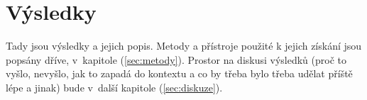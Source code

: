 \chapter{Výsledky}
\label{sec:vysledky}

\noindent Tady jsou výsledky a jejich popis. Metody a přístroje použité k jejich získání jsou popsány dříve, v~kapitole (\ref{sec:metody}). Prostor na diskusi výsledků (proč to vyšlo, nevyšlo, jak to zapadá do kontextu a co by třeba bylo třeba udělat příště lépe a jinak) bude v~další kapitole (\ref{sec:diskuze}).


